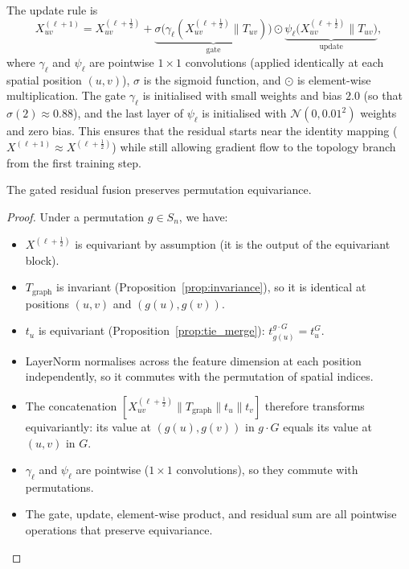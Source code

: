 The update rule is
\[
    X^{(\ell+1)}_{uv}
    = X^{(\ell+\frac{1}{2})}_{uv}
    + \underbrace{\sigma\!\big(\gamma_\ell(X^{(\ell+\frac{1}{2})}_{uv} \| T_{uv})\big)}_{\text{gate}}
    \odot \underbrace{\psi_\ell\!\big(X^{(\ell+\frac{1}{2})}_{uv} \| T_{uv}\big)}_{\text{update}},
\]
where $\gamma_\ell$ and $\psi_\ell$ are pointwise $1 \times 1$ convolutions (applied identically at each spatial position $(u,v)$), $\sigma$ is the sigmoid function, and $\odot$ is element-wise multiplication. The gate $\gamma_\ell$ is initialised with small weights and bias $2.0$ (so that $\sigma(2) \approx 0.88$), and the last layer of $\psi_\ell$ is initialised with $\mathcal{N}(0, 0.01^2)$ weights and zero bias. This ensures that the residual starts near the identity mapping ($X^{(\ell+1)} \approx X^{(\ell+\frac{1}{2})}$) while still allowing gradient flow to the topology branch from the first training step.

\begin{lemma}
\label{lem:fusion_equiv}
The gated residual fusion preserves permutation equivariance.
\end{lemma}

\begin{proof}
Under a permutation $g \in S_n$, we have:
\begin{itemize}
    \item $X^{(\ell+\frac{1}{2})}$ is equivariant by assumption (it is the output of the equivariant block).
    \item $T_{\mathrm{graph}}$ is invariant (Proposition~\ref{prop:invariance}), so it is identical at positions $(u,v)$ and $(g(u),g(v))$.
    \item $t_u$ is equivariant (Proposition~\ref{prop:tie_merge}): $t_{g(u)}^{g \cdot G} = t_u^G$.
    \item LayerNorm normalises across the feature dimension at each position independently, so it commutes with the permutation of spatial indices.
    \item The concatenation $[X^{(\ell+\frac{1}{2})}_{uv} \| T_{\mathrm{graph}} \| t_u \| t_v]$ therefore transforms equivariantly: its value at $(g(u),g(v))$ in $g \cdot G$ equals its value at $(u,v)$ in $G$.
    \item $\gamma_\ell$ and $\psi_\ell$ are pointwise ($1 \times 1$ convolutions), so they commute with permutations.
    \item The gate, update, element-wise product, and residual sum are all pointwise operations that preserve equivariance. \qedhere
\end{itemize}
\end{proof}

